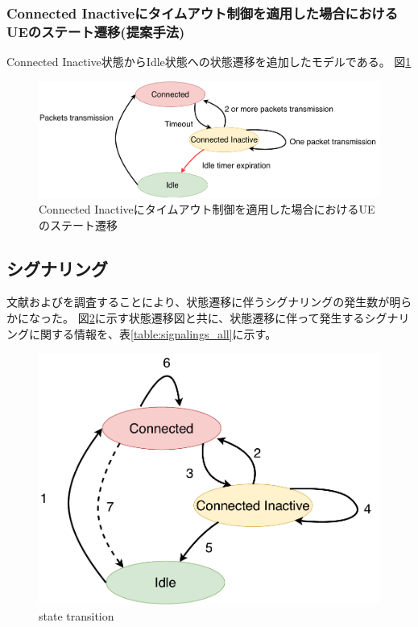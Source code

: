 \documentclass[a4j]{ujarticle}
\begin{document}
    \subsubsection{Connected Inactiveにタイムアウト制御を適用した場合におけるUEのステート遷移(提案手法)}
    Connected Inactive状態からIdle状態への状態遷移を追加したモデルである。
    図\ref{state_change_propose}
    \begin{figure}[htbp]
      \centering
      \includegraphics[width=1.0\hsize]{state_change_propose.pdf}
      \caption{Connected Inactiveにタイムアウト制御を適用した場合におけるUEのステート遷移}
      \label{state_change_propose}
    \end{figure}

    \subsection{シグナリング}
    文献\cite{3gpp.23.720}および\cite{ANovelStateModelfor5GRadioAccessNetworks}を調査することにより、状態遷移に伴うシグナリングの発生数が明らかになった。
    図\ref{state_id}に示す状態遷移図と共に、状態遷移に伴って発生するシグナリングに関する情報を、表\ref{table:signalings_all}に示す。

    \begin{figure}[htbp]
      \centering
      \includegraphics[width=0.9\hsize]{state_id.pdf}
      \caption{state transition}
      \label{state_id}
    \end{figure}
\end{document}
